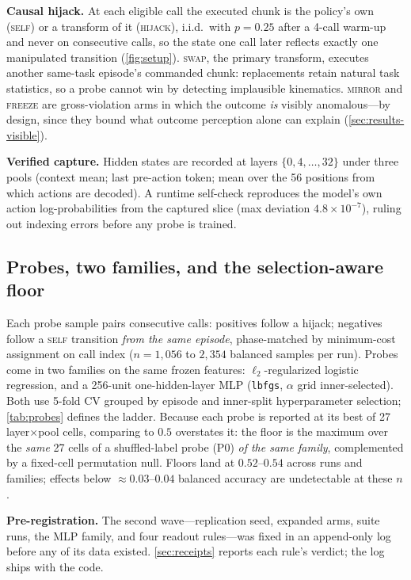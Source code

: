 \documentclass{article}
\begin{document}
\textbf{Causal hijack.} At each eligible call the executed chunk is the
policy's own (\textsc{self}) or a transform of it (\textsc{hijack}), i.i.d.\
with $p{=}0.25$ after a 4-call warm-up and never on consecutive calls, so
the state one call later reflects exactly one manipulated transition
(\cref{fig:setup}). \textsc{swap}, the primary transform, executes another
same-task episode's commanded chunk: replacements retain natural task
statistics, so a probe cannot win by detecting implausible kinematics.
\textsc{mirror} and \textsc{freeze} are gross-violation arms in which the
outcome \emph{is} visibly anomalous---by design, since they bound what
outcome perception alone can explain (\cref{sec:results-visible}).

\textbf{Verified capture.} Hidden states are recorded at layers
$\{0,4,\dots,32\}$ under three pools (context mean; last pre-action token;
mean over the 56 positions from which actions are decoded). A runtime
self-check reproduces the model's own action log-probabilities from the
captured slice (max deviation $4.8\times10^{-7}$), ruling out indexing
errors before any probe is trained.

\subsection{Probes, two families, and the selection-aware floor}
\label{sec:protocol-probes}

Each probe sample pairs consecutive calls: positives follow a hijack;
negatives follow a \textsc{self} transition \emph{from the same episode},
phase-matched by minimum-cost assignment on call index ($n{=}1{,}056$ to
$2{,}354$ balanced samples per run). Probes come in two families on the same
frozen features: $\ell_2$-regularized logistic regression, and a 256-unit
one-hidden-layer MLP (\texttt{lbfgs}, $\alpha$ grid inner-selected). Both
use 5-fold CV grouped by episode and inner-split hyperparameter selection;
\cref{tab:probes} defines the ladder. Because each probe is reported at its
best of 27 layer$\times$pool cells, comparing to $0.5$ overstates it: the
floor is the maximum over the \emph{same} 27 cells of a shuffled-label probe
(P0) \emph{of the same family}, complemented by a fixed-cell permutation
null. Floors land at $0.52$--$0.54$ across runs and families; effects below
${\approx}0.03$--$0.04$ balanced accuracy are undetectable at these $n$.

\textbf{Pre-registration.} The second wave---replication seed, expanded
arms, suite runs, the MLP family, and four readout rules---was fixed in an
append-only log before any of its data existed. \cref{sec:receipts} reports
each rule's verdict; the log ships with the code.
\end{document}

